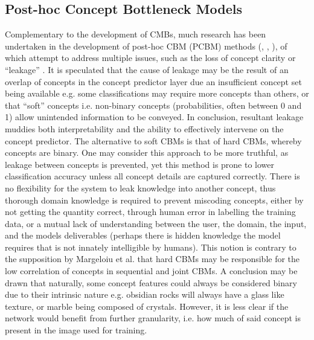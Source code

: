 \subsection{Post-hoc Concept Bottleneck Models}

Complementary to the development of CMBs, much research has been undertaken in the development of post-hoc CBM (PCBM) methods (\cite{havasiAddressingLeakageConcept2022a}, \cite{yuksekgonulPosthocConceptBottleneck2022}, \cite{daneshjouSkinConSkinDisease2022}), of which attempt to address multiple issues, such as the loss of concept clarity or “leakage” \cite{mahinpeiPromisesPitfallsBlackBox2021}. It is speculated that the cause of leakage may be the result of an overlap of concepts in the concept predictor layer due an insufficient concept set being available e.g. some classifications may require more concepts than others, or that “soft” concepts i.e. non-binary concepts (probabilities, often between 0 and 1) allow unintended information to be conveyed. In conclusion, resultant leakage muddies both interpretability and the ability to effectively intervene on the concept predictor. The alternative to soft CBMs is that of hard CBMs, whereby concepts are binary. One may consider this approach to be more truthful, as leakage between concepts is prevented, yet this method is prone to lower classification accuracy unless all concept details are captured correctly. There is no flexibility for the system to leak knowledge into another concept, thus  thorough domain knowledge is required to prevent miscoding concepts, either by not getting the quantity correct, through human error in labelling the training data, or a mutual lack of understanding between the user, the domain, the input, and the models deliverables (perhaps there is hidden knowledge the model requires that is not innately intelligible by humans). This notion is contrary to the supposition by Margeloiu et al. that hard CBMs may be responsible for the low correlation of concepts in sequential and joint CBMs. 
A conclusion may be drawn that naturally, some concept features could always be considered binary due to their intrinsic nature e.g. obsidian rocks will always have a glass like texture, or marble being composed of crystals. However, it is less clear if the network would benefit from further granularity, i.e. how much of said concept is present in the image used for training.


